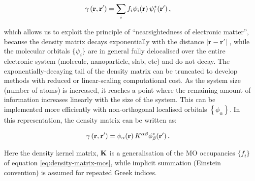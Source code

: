 \documentclass[../main.tex]{subfiles}
\begin{document}
\begin{equation}
    \gamma\left(\mathbf{r},\mathbf{r'}\right)=\sum\limits_i f_i \psi_i\!\left(\mathbf{r}\right)\psi_i^*\!\left(\mathbf{r'}\right), \label{eq:density-matrix-mos}
\end{equation}

which allows us to exploit the principle of ``nearsightedness of electronic matter'',\cite{Prodans2005} because the density matrix decays exponentially with the distance $|\mathbf{r}-\mathbf{r'}|$ \cite{Prodans2005}, while the molecular orbitals $\{ \psi_{i} \}$ are in general fully delocalised over the entire electronic system (molecule, nanoparticle, slab, etc) and do not decay. 
The exponentially-decaying tail of the density matrix can be truncated to develop methods with reduced or linear-scaling computational cost. As the system size (number of atoms) is increased, it reaches a point where the remaining amount of information increases linearly with the size of the system. This can be implemented more efficiently with non-orthogonal localised orbitals $\left\{\phi_\alpha\right\}$.\cite{Galli1992, hernandez1995} In this representation, the density matrix can be written as:

\begin{equation}
    \gamma\left(\mathbf{r},\mathbf{r'}\right)=\phi_\alpha\!\left(\mathbf{r}\right) K^{\alpha\beta} \phi_\beta^*\!\left(\mathbf{r'}\right).
\end{equation}

Here the density kernel matrix, $\bf K$ is a generalisation of the MO occupancies $\{ f_i \} $ of equation \ref{eq:density-matrix-mos}, while implicit summation (Einstein convention) is assumed for repeated Greek indices. 
\end{document}
